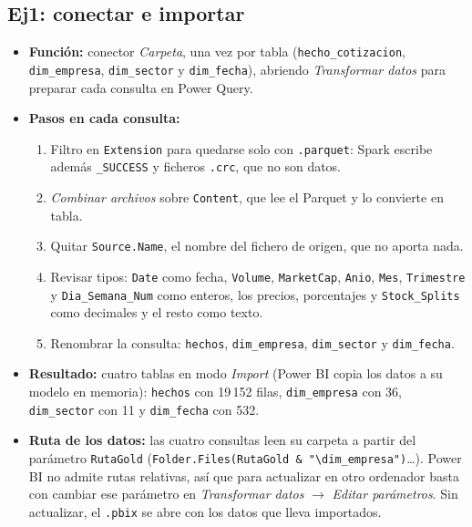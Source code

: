 \documentclass[11pt,a4paper]{article}
\newcommand{\code}[1]{\texttt{#1}}
\begin{document}
\subsection*{Ej1: conectar e importar}
\begin{itemize}
    \item \textbf{Función:} conector \textit{Carpeta}, una vez por tabla (\code{hecho\_cotizacion}, \code{dim\_empresa}, \code{dim\_sector} y \code{dim\_fecha}), abriendo \textit{Transformar datos} para preparar cada consulta en Power Query.
    \item \textbf{Pasos en cada consulta:}
    \begin{enumerate}
        \item Filtro en \code{Extension} para quedarse solo con \code{.parquet}: Spark escribe además \code{\_SUCCESS} y ficheros \code{.crc}, que no son datos.
        \item \textit{Combinar archivos} sobre \code{Content}, que lee el Parquet y lo convierte en tabla.
        \item Quitar \code{Source.Name}, el nombre del fichero de origen, que no aporta nada.
        \item Revisar tipos: \code{Date} como fecha, \code{Volume}, \code{MarketCap}, \code{Anio}, \code{Mes}, \code{Trimestre} y \code{Dia\_Semana\_Num} como enteros, los precios, porcentajes y \code{Stock\_Splits} como decimales y el resto como texto.
        \item Renombrar la consulta: \code{hechos}, \code{dim\_empresa}, \code{dim\_sector} y \code{dim\_fecha}.
    \end{enumerate}
    \item \textbf{Resultado:} cuatro tablas en modo \textit{Import} (Power BI copia los datos a su modelo en memoria): \code{hechos} con 19\,152 filas, \code{dim\_empresa} con 36, \code{dim\_sector} con 11 y \code{dim\_fecha} con 532.
    \item \textbf{Ruta de los datos:} las cuatro consultas leen su carpeta a partir del parámetro \code{RutaGold} (\code{Folder.Files(RutaGold \& "\textbackslash{}dim\_empresa")}\ldots). Power BI no admite rutas relativas, así que para actualizar en otro ordenador basta con cambiar ese parámetro en \textit{Transformar datos} $\rightarrow$ \textit{Editar parámetros}. Sin actualizar, el \code{.pbix} se abre con los datos que lleva importados.
\end{itemize}
\end{document}
